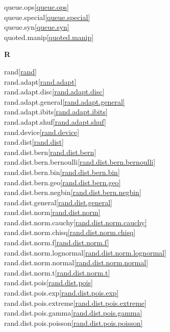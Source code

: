 \begin{multicols}{2}
queue.ops\quad\ref{queue.ops}\\
queue.special\quad\ref{queue.special}\\
queue.syn\quad\ref{queue.syn}\\
quoted.manip\quad\ref{quoted.manip}\\
\par \textbf{R}\par
rand\quad\ref{rand}\\
rand.adapt\quad\ref{rand.adapt}\\
rand.adapt.disc\quad\ref{rand.adapt.disc}\\
rand.adapt.general\quad\ref{rand.adapt.general}\\
rand.adapt.ibits\quad\ref{rand.adapt.ibits}\\
rand.adapt.shuf\quad\ref{rand.adapt.shuf}\\
rand.device\quad\ref{rand.device}\\
rand.dist\quad\ref{rand.dist}\\
rand.dist.bern\quad\ref{rand.dist.bern}\\
rand.dist.bern.bernoulli\quad\ref{rand.dist.bern.bernoulli}\\
rand.dist.bern.bin\quad\ref{rand.dist.bern.bin}\\
rand.dist.bern.geo\quad\ref{rand.dist.bern.geo}\\
rand.dist.bern.negbin\quad\ref{rand.dist.bern.negbin}\\
rand.dist.general\quad\ref{rand.dist.general}\\
rand.dist.norm\quad\ref{rand.dist.norm}\\
rand.dist.norm.cauchy\quad\ref{rand.dist.norm.cauchy}\\
rand.dist.norm.chisq\quad\ref{rand.dist.norm.chisq}\\
rand.dist.norm.f\quad\ref{rand.dist.norm.f}\\
rand.dist.norm.lognormal\quad\ref{rand.dist.norm.lognormal}\\
rand.dist.norm.normal\quad\ref{rand.dist.norm.normal}\\
rand.dist.norm.t\quad\ref{rand.dist.norm.t}\\
rand.dist.pois\quad\ref{rand.dist.pois}\\
rand.dist.pois.exp\quad\ref{rand.dist.pois.exp}\\
rand.dist.pois.extreme\quad\ref{rand.dist.pois.extreme}\\
rand.dist.pois.gamma\quad\ref{rand.dist.pois.gamma}\\
rand.dist.pois.poisson\quad\ref{rand.dist.pois.poisson}\\

\end{multicols}
